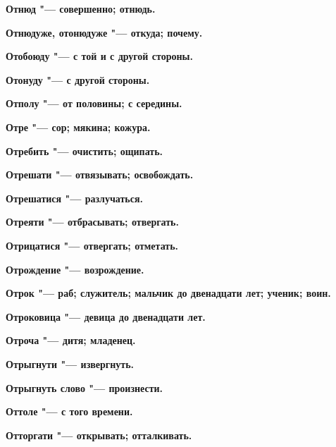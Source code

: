 \begin{mymulticols}{2}
\bfseries Отнюд\normalfont{} "--- совершенно; отнюдь. 




\bfseries Отнюдуже, отонюдуже\normalfont{} "--- откуда; почему. 




\bfseries Отобоюду\normalfont{} "--- с той и с другой стороны. 




\bfseries Отонуду\normalfont{} "--- с другой стороны. 




\bfseries Отполу\normalfont{} "--- от половины; с середины. 




\bfseries Отре\normalfont{} "--- сор; мякина; кожура. 




\bfseries Отребить\normalfont{} "--- очистить; ощипать. 




\bfseries Отрешати\normalfont{} "--- отвязывать; освобождать. 




\bfseries Отрешатися\normalfont{} "--- разлучаться. 




\bfseries Отреяти\normalfont{} "--- отбрасывать; отвергать. 




\bfseries Отрицатися\normalfont{} "--- отвергать; отметать. 




\bfseries Отрождение\normalfont{} "--- возрождение. 




\bfseries Отрок\normalfont{} "--- раб; служитель; мальчик до двенадцати лет; ученик; воин. 




\bfseries Отроковица\normalfont{} "--- девица до двенадцати лет. 




\bfseries Отроча\normalfont{} "--- дитя; младенец. 




\bfseries Отрыгнути\normalfont{} "--- извергнуть. 




\bfseries Отрыгнуть слово\normalfont{} "--- произнести. 




\bfseries Оттоле\normalfont{} "--- с того времени. 




\bfseries Отторгати\normalfont{} "--- открывать; отталкивать. 





\end{mymulticols}
